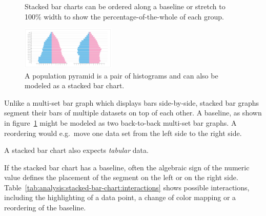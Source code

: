\begin{figure}
  \centering
  \caption{Stacked bar charts can be ordered along a baseline or stretch to 100\% width to show the percentage-of-the-whole of each group.}%
  \label{fig:analysis:stacked-bar-chart}
  \qquad
\end{figure}

\begin{figure}
  \centering
  \caption{A population pyramid is a pair of histograms and can also be modeled as a stacked bar chart.}%
  \label{fig:analysis:population-pyramid}
  \includegraphics[width=0.4\textwidth]{figures/analysis/population-pyramid.png}%
\end{figure}

Unlike a multi-set bar graph which displays bars side-by-side, stacked bar graphs segment their bars of multiple datasets on top of each other.
A baseline, as shown in figure~\ref{fig:analysis:stacked-bar-chart} might be modeled as two back-to-back multi-set bar graphs. A reordering would e.g.\ move one data set from the left side to the right side.

A stacked bar chart also expects \emph{tabular} data.

If the stacked bar chart has a baseline, often the algebraic sign of the numeric value defines the placement of the segment on the left or on the right side.
Table~\ref{tab:analysis:stacked-bar-chart:interactions} shows possible interactions, including the highlighting of a data point, a change of color mapping or a reordering of the baseline.

